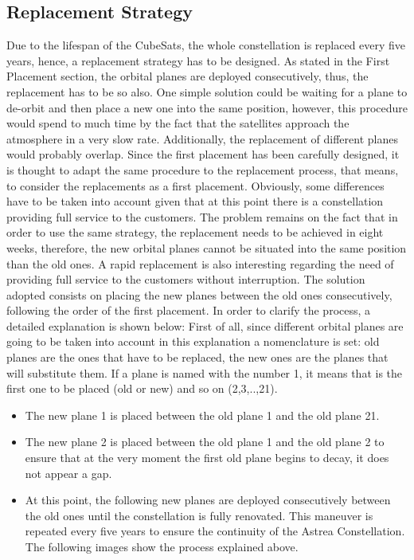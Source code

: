 \subsection{Replacement Strategy}
Due to the lifespan of the CubeSats, the whole constellation is replaced every five years, hence, a replacement strategy has to be designed. As stated in the First Placement section, the orbital planes are deployed consecutively, thus, the replacement has to be so also. One simple solution could be waiting for a plane to de-orbit and then place a new one into the same position, however, this procedure would spend to much time by the fact that the satellites approach the atmosphere in a very slow rate. Additionally, the replacement of different planes would probably overlap. Since the first placement has been carefully designed, it is thought to adapt the same procedure to the replacement process, that means, to consider the replacements as a first placement. Obviously, some differences have to be taken into account given that at this point there is a constellation providing full service to the customers. The problem remains on the fact that in order to use the same strategy, the replacement needs to be achieved in eight weeks, therefore, the new orbital planes cannot be situated into the same position than the old ones. A rapid replacement is also interesting regarding the need of providing full service to the customers without interruption. The solution adopted consists on placing the new planes between the old ones consecutively, following the order of the first placement. In order to clarify the process, a detailed explanation is shown below:
\newline\newline
First of all, since different orbital planes are going to be taken into account in this explanation a nomenclature is set: old planes are the ones that have to be replaced, the new ones are the planes that will substitute them. If a plane is named with the number 1, it means that is the first one to be placed (old or new) and so on (2,3,..,21). 
\begin{itemize}
\item The new plane 1 is placed between the old plane 1 and the old plane 21.
\item The new plane 2 is placed between the old plane 1 and the old plane 2 to ensure that at the very moment the first old plane begins to decay, it does not appear a gap.
\item At this point, the following new planes are deployed consecutively between the old ones until the constellation is fully renovated. This maneuver is repeated every five years to ensure the continuity of the Astrea Constellation. 
The following images show the process explained above.
\end{itemize}
